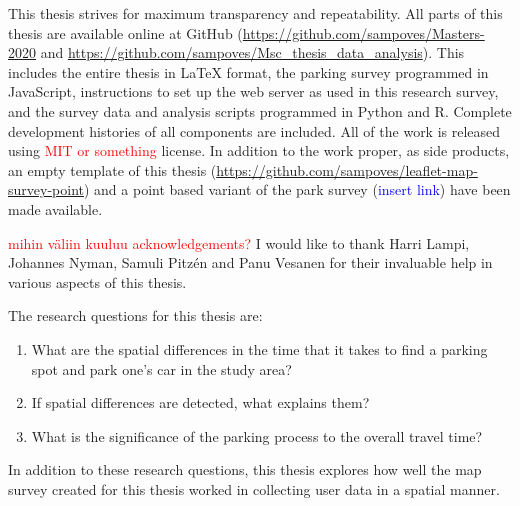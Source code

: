 This thesis strives for maximum transparency and repeatability. All parts of this thesis are available online at GitHub (\textcolor{blue}{\url{https://github.com/sampoves/Masters-2020}} and \textcolor{blue}{\url{https://github.com/sampoves/Msc_thesis_data_analysis}}). This includes the entire thesis in LaTeX format, the parking survey programmed in JavaScript, instructions to set up the web server as used in this research survey, and the survey data and analysis scripts programmed in Python and R. Complete development histories of all components are included. All of the work is released using \textcolor{red}{MIT or something} license. In addition to the work proper, as side products, an empty template of this thesis (\textcolor{blue}{\url{https://github.com/sampoves/leaflet-map-survey-point}}) and a point based variant of the park survey (\textcolor{blue}{insert link}) have been made available.

\textcolor{red}{mihin väliin kuuluu acknowledgements?} I would like to thank Harri Lampi, Johannes Nyman, Samuli Pitzén and Panu Vesanen for their invaluable help in various aspects of this thesis.

\bigskip
\noindent
The research questions for this thesis are:

\begin{spacing}{1}
    \begin{enumerate}[label=\Roman*]
      \item What are the spatial differences in the time that it takes to find a parking spot and park one’s car in the study area?
      \item If spatial differences are detected, what explains them?
      \item What is the significance of the parking process to the overall travel time?
    \end{enumerate}
\end{spacing}
\bigskip
In addition to these research questions, this thesis explores how well the map survey created for this thesis worked in collecting user data in a spatial manner.